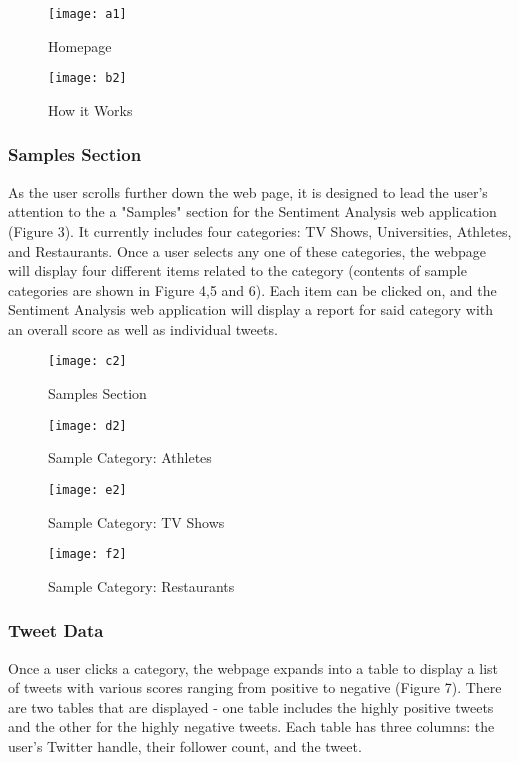 \documentclass[12pt, titlepage]{article}
\begin{document}
\begin{figure}[H]
\centering
\texttt{[image: a1]}
\caption{Homepage}
\label{fig:Result}
\end{figure}

\begin{figure}[H]
\centering
\texttt{[image: b2]}
\caption{How it Works}
\label{fig:Result}
\end{figure}

\subsubsection{Samples Section}
As the user scrolls further down the web page, it is designed to lead the user's attention to the a "Samples" section for the Sentiment Analysis web application (Figure 3). It currently includes four categories: TV Shows, Universities, Athletes, and Restaurants. Once a user selects any one of these categories, the webpage will display four different items related to the category (contents of sample categories are shown in Figure 4,5 and 6). Each item can be clicked on, and the Sentiment Analysis web application will display a report for said category with an overall score as well as individual tweets.

\begin{figure}[H]
\centering
\texttt{[image: c2]}
\caption{Samples Section}
\label{fig:Result}
\end{figure}

\begin{figure}[H]
\centering
\texttt{[image: d2]}
\caption{Sample Category: Athletes}
\label{fig:Result}
\end{figure}

\begin{figure}[H]
\centering
\texttt{[image: e2]}
\caption{Sample Category: TV Shows}
\label{fig:Result}
\end{figure}

\begin{figure}[H]
\centering
\texttt{[image: f2]}
\caption{Sample Category: Restaurants}
\label{fig:Result}
\end{figure}


\subsubsection{Tweet Data}
Once a user clicks a category, the webpage expands into a table to display a list of tweets with various scores ranging from positive to negative (Figure 7). There are two tables that are displayed - one table includes the highly positive tweets and the other for the highly negative tweets. Each table has three columns: the user's Twitter handle, their follower count, and the tweet. 
\end{document}
